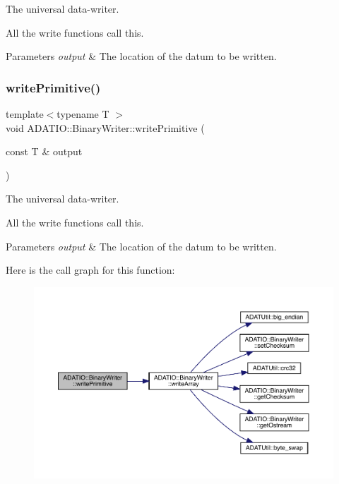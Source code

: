 The universal data-\/writer. 

All the write functions call this. 
\begin{DoxyParams}{Parameters}
{\em output} & The location of the datum to be written. \\
\hline
\end{DoxyParams}
\mbox{\label{classADATIO_1_1BinaryWriter_a4415e2d04de75ea6310a8eed3be8f43e}} 
\subsubsection{\texorpdfstring{writePrimitive()}{writePrimitive()}\hspace{0.1cm}{\footnotesize\ttfamily [2/2]}}
{\footnotesize\ttfamily template$<$typename T $>$ \\
void A\+D\+A\+T\+I\+O\+::\+Binary\+Writer\+::write\+Primitive (\begin{DoxyParamCaption}\item[{const T \&}]{output }\end{DoxyParamCaption})\hspace{0.3cm}{\ttfamily [protected]}}



The universal data-\/writer. 

All the write functions call this. 
\begin{DoxyParams}{Parameters}
{\em output} & The location of the datum to be written. \\
\hline
\end{DoxyParams}
Here is the call graph for this function\+:\nopagebreak
\begin{figure}[H]
\begin{center}
\leavevmode
\includegraphics[width=350pt]{db/dee/classADATIO_1_1BinaryWriter_a4415e2d04de75ea6310a8eed3be8f43e_cgraph}
\end{center}
\end{figure}


